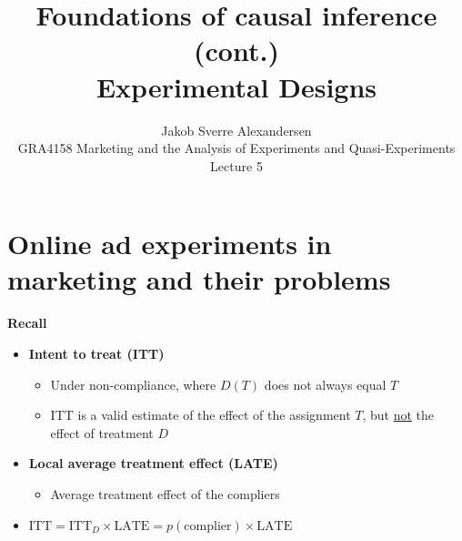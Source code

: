 \documentclass[10pt]{article}
\begin{document}
 
\title{Foundations of causal inference (cont.)\\Experimental Designs}
\author{Jakob Sverre Alexandersen\\
GRA4158 Marketing and the Analysis of Experiments and Quasi-Experiments\\
Lecture 5}
\maketitle

\tableofcontents
\newpage
\section{Online ad experiments in marketing and their problems}
\textbf{Recall}
\begin{itemize}
    \item \textbf{Intent to treat (ITT)}
    \begin{itemize}
        \item Under non-compliance, where $D(T) $ does not always equal $T $
        \item ITT is a valid estimate of the effect of the assignment $T $, but \underline{not} the effect of treatment $D $
    \end{itemize}
    \item \textbf{Local average treatment effect (LATE)}
    \begin{itemize}
        \item Average treatment effect of the compliers
    \end{itemize}
    \item $\text{ITT} = \text{ITT}_D\times\text{LATE} = p(\text{complier})\times\text{LATE}$
\end{itemize}
\end{document}
